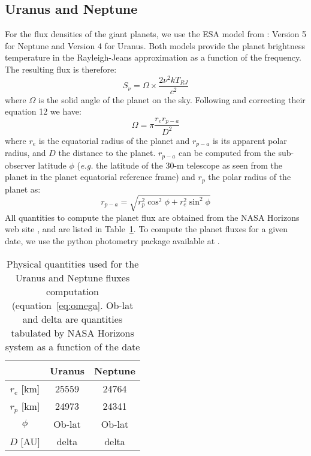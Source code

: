 %


\subsection{Uranus and Neptune}
\label{se:ref_flux_uranus_neptune}

For the flux densities of the giant planets, we use the ESA model from
\cite{ESAmodel}: Version 5 for Neptune and Version 4 for Uranus. 
Both models provide the planet brightness temperature in the
Rayleigh-Jeans approximation as a function of the frequency. The
resulting flux is therefore: 
\begin{equation}
S_{\nu} = \Omega \times \frac{2 \nu^{2} k T_{RJ}}{c^2}
\end{equation}
where $\Omega$ is the solid angle of the planet on the sky. Following
\cite{bendo2013} and correcting their equation 12 we have:
%
\begin{equation}
\Omega = \pi \frac{r_{e} r_{p-a}}{D^{2}} 
\label{eq:omega}
\end{equation}
where $r_{e}$ is the equatorial radius of the planet and $r_{p-a}$ is
its apparent polar radius, and $D$ the distance to the
planet. $r_{p-a}$ can be computed from the sub-observer latitude $\phi$
({\it e.g.} the latitude of the 30-m telescope as seen from the planet in the
planet equatorial reference frame) and $r_{p}$ the polar radius of the
planet as:
\begin{equation}
r_{p-a} = \sqrt{r_{p}^2 \cos^{2}\phi + r_{e}^2 \sin^{2} \phi}
\end{equation}
All quantities to compute the planet flux are obtained from the NASA
Horizons web site \cite{NASAHorizon}, and are
listed in Table~\ref{tab:planetphysparam}. To compute the planet fluxes for a given date, we use the python
photometry package available at \cite{gith-Haussel}.

\begin{table}[ht]
\begin{center}
\begin{tabular}{|c|c|c|}
\hline
     & Uranus & Neptune \\
\hline
$r_{e}$ [km]  & 25559 & 24764 \\ 
\hline
$r_{p}$ [km]  & 24973 & 24341  \\
\hline
$\phi$         & Ob-lat & Ob-lat \\
\hline
$D$   [AU]    & delta   & delta \\
\hline
\end{tabular}
\end{center}
\caption[Primary calibrator flux models]{Physical quantities used for the Uranus and Neptune fluxes
  computation (equation~\ref{eq:omega}. Ob-lat and delta are quantities 
  tabulated by NASA Horizons system \cite{NASAHorizon} as a function of the date}
\label{tab:planetphysparam}
\end{table}


